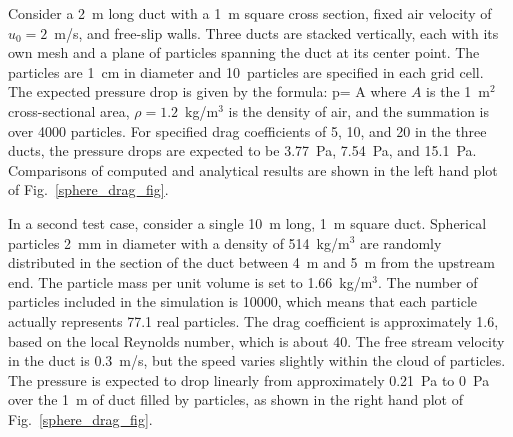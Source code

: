 \documentclass[11pt]{book}
\begin{document}
Consider a 2~m long duct with a 1~m square cross section, fixed air velocity of $u_0=2$~m/s, and free-slip walls. Three ducts are stacked vertically, each with its own mesh and a plane of particles spanning the duct at its center point. The particles are 1~cm in diameter and 10~particles are specified in each grid cell. The expected pressure drop is given by the formula:
\be \Delta p= \rho {} {A} \ee
where $A$ is the 1~m$^2$ cross-sectional area, $\rho=1.2$~kg/m$^3$ is the density of air, and the summation is over 4000 particles. For specified drag coefficients of 5, 10, and 20 in the three ducts, the pressure drops are expected to be 3.77~Pa, 7.54~Pa, and 15.1~Pa.  Comparisons of computed and analytical results are shown in the left hand plot of Fig.~\ref{sphere_drag_fig}.

In a second test case, consider a single 10~m long, 1~m square duct. Spherical particles 2~mm in diameter with a density of 514~kg/m$^3$ are randomly distributed in the section of the duct between 4~m and 5~m from the upstream end. The particle mass per unit volume is set to 1.66~kg/m$^3$. The number of particles included in the simulation is 10000, which means that each particle actually represents 77.1 real particles. The drag coefficient is approximately 1.6, based on the local Reynolds number, which is about 40. The free stream velocity in the duct is 0.3~m/s, but the speed varies slightly within the cloud of particles. The pressure is expected to drop linearly from approximately 0.21~Pa to 0~Pa over the 1~m of duct filled by particles, as shown in the right hand plot of Fig.~\ref{sphere_drag_fig}.
\end{document}
